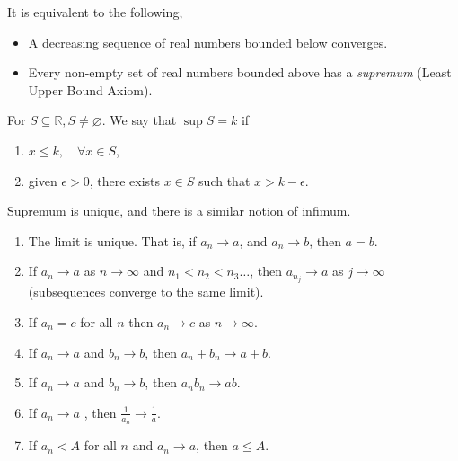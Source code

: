 \begin{remark}
    It is equivalent to the following,
    \begin{itemize}
        \item A decreasing sequence of real numbers bounded below converges.
        \item Every non-empty set of real numbers bounded above has a \textit{supremum} (Least Upper Bound Axiom).
    \end{itemize}
\end{remark}
\begin{definition}[supremum]
    For \(S \subseteq \mathbb{R},S\neq \varnothing\). We say that \(\sup S = k\) if 
    \begin{enumerate}
        \item \(x \leq k, \quad \forall x \in S\),
        \item given \(\epsilon > 0\), there exists \(x \in S\) such that \(x > k - \epsilon\).
    \end{enumerate}
\end{definition}
\begin{note}
    Supremum is unique, and there is a similar notion of infimum.
\end{note}
\begin{lemma}
    \label{limprop}
    \leavevmode
    \begin{enumerate}
        \item The limit is unique. That is, if \(a_n \to a\), and \(a_n \to b\), then \(a = b\).
        \item If \(a_n \to a\) as \(n \to \infty\) and \(n_1 < n_2 < n_3 \ldots \), then \(a_{n_j}\to a\) as \(j \to \infty\) (subsequences converge to the same limit).
        \item If \(a_n = c\) for all \(n\) then \(a_n \to c\) as \(n \to \infty\).
        \item If \(a_n \to a\) and \(b_n \to b\), then \(a_n + b_n \to  a+ b\).
        \item If \(a_n \to a\) and \(b_n \to b\), then \(a_n b_n \to  ab\).
        \item If \(a_n \to a\) , then \(\frac{1}{a_n} \to \frac{1}{a}\).
        \item If \(a_n < A\) for all \(n\) and \(a_n \to a\), then \(a \leq A\).
    \end{enumerate}
\end{lemma}
